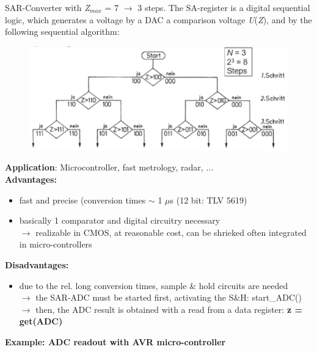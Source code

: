 \os{\newpage}

SAR-Converter with \textit{Z${}_{max}$} = 7 $\rightarrow$  3 steps. The SA-register is a digital sequential logic, which generates a voltage by a DAC a comparison voltage \textit{U}(\textit{Z}), and by the following sequential algorithm:

    \begin{figure}[h]
    \centering
    \includegraphics[width=12cm, height=4.5cm]{Images/image177.png}
    \label{fig:Fig 131}
    \end{figure}

\os{\newpage}

\textbf{Application}: Microcontroller, fast metrology, radar, ...\\

\textbf{Advantages: }

\begin{itemize}
\item fast and precise (conversion times $\mathrm{\sim}$ 1 $\mu$s (12 bit: TLV 5619)
\item  basically 1 comparator and digital circuitry necessary  \\
$\rightarrow$ realizable in CMOS, at reasonable cost, can be shrieked often integrated in micro-controllers
\end{itemize}

\textbf{Disadvantages: }

\begin{itemize}
\item \textbf{ }due to the rel. long conversion times, sample \& hold circuits are needed \\
$\rightarrow$ the SAR-ADC must be started first, activating the S\&H:     start\_ADC()  \\
$\rightarrow$ then, the ADC result is obtained with a read from a data register:   \textbf{z = get(ADC)}
\end{itemize}

\os{\newpage}

\textbf{Example: ADC readout with AVR micro-controller}\\

